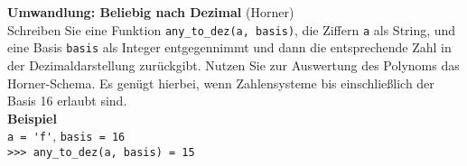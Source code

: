 \textbf{Umwandlung: Beliebig nach Dezimal} (Horner)\\
Schreiben Sie eine Funktion \verb|any_to_dez(a, basis)|, die Ziffern \verb|a| als String, und eine Basis \verb|basis| als Integer entgegennimmt und dann die entsprechende Zahl in der Dezimaldarstellung zurückgibt. Nutzen Sie zur Auswertung des Polynoms das Horner-Schema. Es genügt hierbei, wenn Zahlensysteme bis einschließlich der Basis 16 erlaubt sind.\\

\textbf{Beispiel} \\
\verb|a = 'f'|, \verb|basis = 16| \\
\verb|>>> any_to_dez(a, basis) = 15|